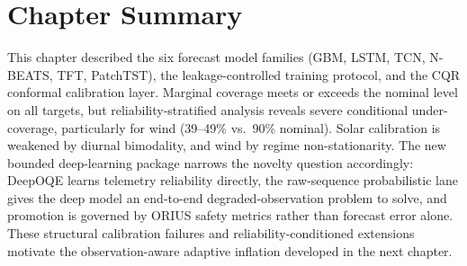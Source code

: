 \section{Chapter Summary}

This chapter described the six forecast model families (GBM, LSTM, TCN,
N-BEATS, TFT, PatchTST), the leakage-controlled training protocol, and the
CQR conformal calibration layer.  Marginal coverage meets or exceeds the
nominal level on all targets, but reliability-stratified analysis reveals
severe conditional under-coverage, particularly for wind (39--49\% vs.\ 90\%
nominal).  Solar calibration is weakened by diurnal bimodality, and wind by
regime non-stationarity.  The new bounded deep-learning package narrows the
novelty question accordingly: DeepOQE learns telemetry reliability directly,
the raw-sequence probabilistic lane gives the deep model an end-to-end
degraded-observation problem to solve, and promotion is governed by ORIUS
safety metrics rather than forecast error alone.  These structural calibration
failures and reliability-conditioned extensions motivate the
observation-aware adaptive inflation developed in the next chapter.
